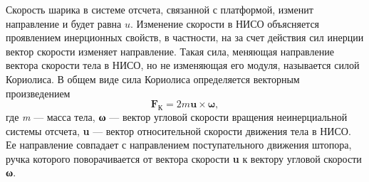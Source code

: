 \documentclass[All.tex]{subfiles}
\begin{document}
	Скорость шарика в системе отсчета, связанной с платформой, изменит направление и будет равна $ u $. Изменение скорости в НИСО объясняется проявлением инерционных свойств, в частности, на за счет действия сил инерции вектор скорости изменяет направление.
	Такая сила, меняющая направление вектора скорости тела в НИСО, но не изменяющая его модуля, называется силой Кориолиса.
	В общем виде сила Кориолиса определяется векторным произведением
	\begin{equation}\label{Coriolis-1eq5}
	\textbf{F}_{\text{К}} = 2m\textbf{u}\times\textbf{ω},	
	\end{equation}	
	где \textit{m} — масса тела, \textbf{ω} — вектор угловой скорости вращения неинерциальной системы отсчета, \textbf{u} — вектор относительной скорости движения тела в НИСО.
	Ее направление совпадает с направлением поступательного движения штопора, ручка которого поворачивается от вектора скорости \textbf{u} к вектору угловой скорости \textbf{ω}. 
\end{document}
